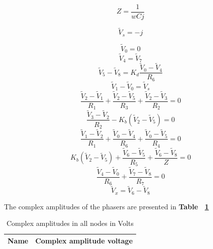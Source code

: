 \begin {equation}
	Z = \frac{1}{w C j}
	\label{eq:Z}
\end{equation}

\begin {equation}
	\tilde{V}_s = -j
	\label{eq:vs}
\end{equation}

\begin {equation}
	\tilde{V}_0 = 0
	\label{eq:p1}
\end{equation}
\begin {equation}
	\tilde{V}_4 = \tilde{V}_7
	\label{eq:p2}
\end{equation}
\begin {equation}
	\tilde{V}_5 - \tilde{V}_8 = K_d \frac{\tilde{V}_0 - \tilde{V}_4}{R_6}
	\label{eq:p3}
\end{equation}
\begin {equation}
	\tilde{V}_1 - \tilde{V}_0 = \tilde{V}_s
	\label{eq:p4}
\end{equation}
\begin {equation}
	\frac{\tilde{V}_2-\tilde{V}_1}{R_1} + \frac{\tilde{V}_2 - \tilde{V}_5}{R_3} + \frac{\tilde{V}_2 - \tilde{V}_3}{R_2} = 0
	\label{eq:p5}
\end{equation}
\begin {equation}
	\frac{\tilde{V}_3-\tilde{V}_2}{R_2} - K_b(\tilde{V}_2-\tilde{V}_5)  = 0
	\label{eq:p6}
\end{equation}
\begin {equation}
	\frac{\tilde{V}_1-\tilde{V}_2}{R_1} + \frac{\tilde{V}_0-\tilde{V}_4}{R_6} + \frac{\tilde{V}_0-\tilde{V}_5}{R_4} = 0
	\label{eq:p7}
\end{equation}
\begin {equation}
	K_b(\tilde{V}_2-\tilde{V}_5) + \frac{\tilde{V}_6-\tilde{V}_5}{R_5} + \frac{\tilde{V}_6-\tilde{V}_8}{Z}  = 0
	\label{eq:p8}
\end{equation}
\begin {equation}
	\frac{\tilde{V}_4-\tilde{V}_0}{R_6} + \frac{\tilde{V}_7 - \tilde{V}_8}{R_7} = 0
	\label{eq:p9}
\end{equation}
\begin {equation}
	\tilde{V}_x = \tilde{V}_6 - \tilde{V}_8
	\label{eq:p10}
\end{equation}


The complex amplitudes of the phasers are presented in  \textbf{Table ~\ref{tab:equivalent resistor}}
\begin{table}[H]
  \centering
  \begin{tabular}{|l|r|}
    \hline    
    {\bf Name} & {\bf Complex amplitude voltage}\\ \hline
    
  \end{tabular}
  \caption{Complex amplitudes in all nodes in Volts}
  \label{tab:equivalent resistor}
\end{table}
\vspace{10cm}

